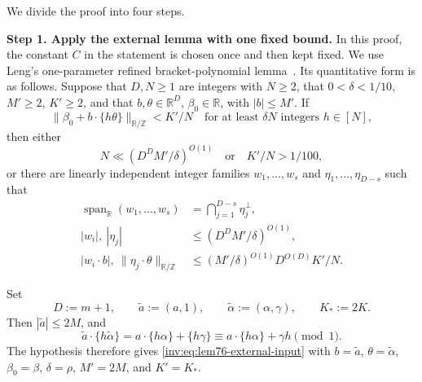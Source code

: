 \documentclass[twoside]{aomart}
\makeatletter
\theoremstyle{paperplain}
\theoremstyle{paperdefinition}
\renewenvironment{proof}[1][\proofname]{\par\pushQED{\qed}%
  \normalfont\topsep6\p@\@plus3\p@\relax\trivlist
  \item[\hskip\labelsep\itshape #1\@addpunct{.}]\ignorespaces
}{\popQED\endtrivlist\@endpefalse}
\numberwithin{equation}{section}
\makeatother
\begin{document}
\begin{proof}
We divide the proof into four steps.	
	
\par
\medskip
\noindent\textbf{Step 1. Apply the external lemma with one fixed bound.}
In this proof, the constant $C$ in the statement is chosen once and
then kept fixed. We use Leng's one-parameter refined
bracket-polynomial lemma~\cite[Lemma~3.1]{LengEquid}.
Its quantitative form is as follows. Suppose that $D,N\ge1$ are
integers with $N\ge2$, that $0<\delta<1/10$, $M'\ge2$, $K'\ge2$,
and that $b,\theta\in\mathbb R^D$, $\beta_0\in\mathbb R$, with
$|b|\le M'$. If
\begin{equation}
 \|\beta_0+b\cdot\{h\theta\}\|_{\mathbb R/\mathbb Z}<K'/N
 \quad\text{for at least $\delta N$ integers $h\in[N]$},
 \label{inv:eq:lem76-external-input}
\end{equation}
then either
\[
 N\ll(D^DM'/\delta)^{O(1)}
 \quad\text{or}\quad K'/N>1/100,
\]
or there are linearly independent integer families
$w_1,\ldots,w_s$ and $\eta_1,\ldots,\eta_{D-s}$ such that
\begin{align*}
 \operatorname{span}_{\mathbb R}(w_1,\ldots,w_s)
   &=\bigcap_{j=1}^{D-s}\eta_j^\perp,
 \\
 |w_i|,\ |\eta_j|&\le(D^DM'/\delta)^{O(1)},
 \\
 |w_i\cdot b|,\ \|\eta_j\cdot\theta\|_{\mathbb R/\mathbb Z}
   &\le (M'/\delta)^{O(1)}D^{O(D)}K'/N.
\end{align*}

Set
\begin{equation*}
 D:=m+1,\qquad \widetilde a:=(a,1),\qquad
 \widetilde\alpha:=(\alpha,\gamma),\qquad K_*:=2K.
\end{equation*}
Then $|\widetilde a|\le2M$, and
\begin{equation*}
 \widetilde a\cdot\{h\widetilde\alpha\}
 =a\cdot\{h\alpha\}+\{h\gamma\}
 \equiv a\cdot\{h\alpha\}+\gamma h\pmod1.
\end{equation*}
The hypothesis therefore gives \eqref{inv:eq:lem76-external-input}
with $b=\widetilde a$, $\theta=\widetilde\alpha$,
$\beta_0=\beta$, $\delta=\rho$, $M'=2M$, and $K'=K_*$.


\end{proof}
\end{document}
